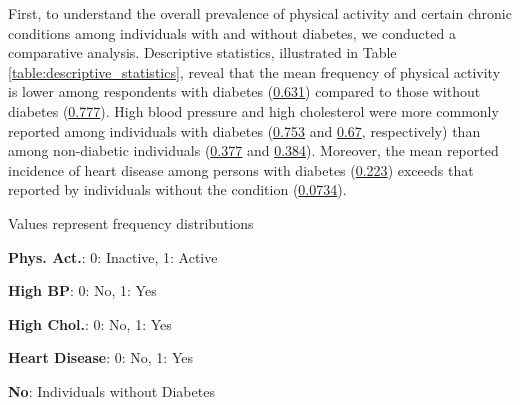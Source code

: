 \documentclass[11pt]{article}
\begin{document}
First, to understand the overall prevalence of physical activity and certain chronic conditions among individuals with and without diabetes, we conducted a comparative analysis. Descriptive statistics, illustrated in Table \ref{table:descriptive_statistics}, reveal that the mean frequency of physical activity is lower among respondents with diabetes (\hyperlink{A2a}{0.631}) compared to those without diabetes (\hyperlink{A1a}{0.777}). High blood pressure and high cholesterol were more commonly reported among individuals with diabetes (\hyperlink{A2b}{0.753} and \hyperlink{A2c}{0.67}, respectively) than among non-diabetic individuals (\hyperlink{A1b}{0.377} and \hyperlink{A1c}{0.384}). Moreover, the mean reported incidence of heart disease among persons with diabetes (\hyperlink{A2d}{0.223}) exceeds that reported by individuals without the condition (\hyperlink{A1d}{0.0734}).

\begin{table}[h]
\caption{\protect\hyperlink{file-table-0-pkl}{Descriptive statistics of Physical Activity and Chronic Health Conditions stratified by Diabetes status}}
\label{table:descriptive_statistics}
\begin{threeparttable}
\renewcommand{\TPTminimum}{\linewidth}
\begin{tablenotes}
\footnotesize
\item Values represent frequency distributions
\item \textbf{Phys. Act.}: 0: Inactive, 1: Active
\item \textbf{High BP}: 0: No, 1: Yes
\item \textbf{High Chol.}: 0: No, 1: Yes
\item \textbf{Heart Disease}: 0: No, 1: Yes
\item \textbf{No}: Individuals without Diabetes
\end{tablenotes}
\end{threeparttable}
\end{table}
\end{document}
